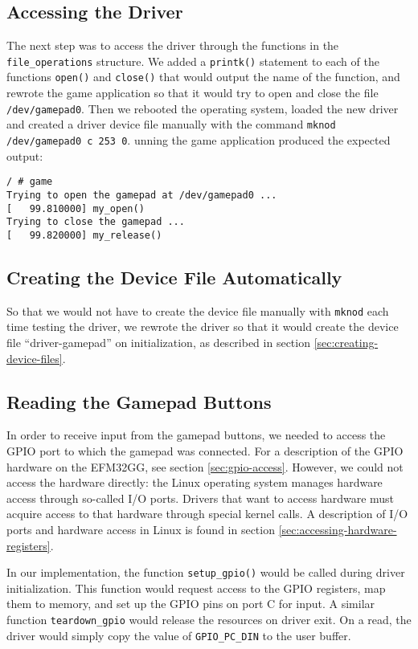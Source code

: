 \subsection{Accessing the Driver}
The next step was to access the driver through the functions in the \texttt{file\_operations} structure. We added a \texttt{printk()} statement to each of the functions \texttt{open()} and \texttt{close()} that would output the name of the function, and rewrote the game application so that it would try to open and close the file \texttt{/dev/gamepad0}. Then we rebooted the operating system, loaded the new driver and created a driver device file manually with the command \texttt{mknod /dev/gamepad0 c 253 0}. unning the game application produced the expected output:
\lstset{style=lststyle-terminal}
\begin{lstlisting}[caption=Accessing the driver,label=lst:accessing-the-driver]
/ # game
Trying to open the gamepad at /dev/gamepad0 ...
[   99.810000] my_open()
Trying to close the gamepad ...
[   99.820000] my_release()
\end{lstlisting}

\subsection{Creating the Device File Automatically}
So that we would not have to create the device file manually with \texttt{mknod} each time testing the driver, we rewrote the driver so that it would create the device file ``driver-gamepad'' on initialization, as described in section \ref{sec:creating-device-files}.

\subsection{Reading the Gamepad Buttons}
In order to receive input from the gamepad buttons, we needed to access the GPIO port to which the gamepad was connected. For a description of the GPIO hardware on the EFM32GG, see section \ref{sec:gpio-access}. However, we could not access the hardware directly: the Linux operating system manages hardware access through so-called I/O ports. Drivers that want to access hardware must acquire access to that hardware through special kernel calls. A description of I/O ports and hardware access in Linux is found in section \ref{sec:accessing-hardware-registers}.

In our implementation, the function \texttt{setup\_gpio()} would be called during driver initialization. This function would request access to the GPIO registers, map them to memory, and set up the GPIO pins on port C for input. A similar function \texttt{teardown\_gpio} would release the resources on driver exit. On a read, the driver would simply copy the value of \texttt{GPIO\_PC\_DIN} to the user buffer.

